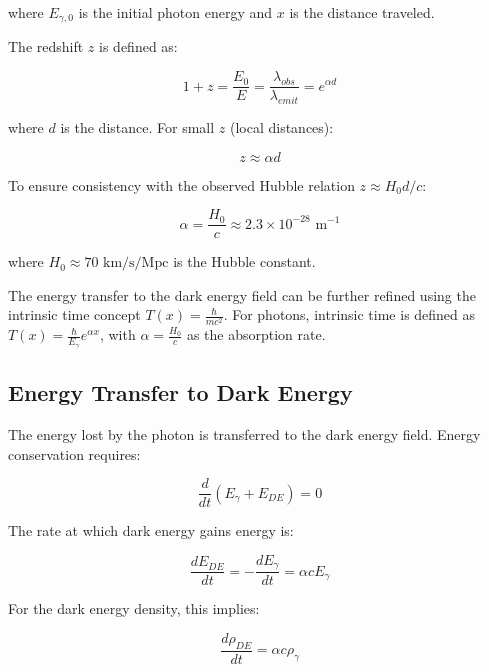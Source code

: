 \documentclass[a4paper,12pt]{article}
\theoremstyle{definition}
\theoremstyle{remark}
\newcommand{\Tfield}{T(x)}
\begin{document}
	where $E_{\gamma,0}$ is the initial photon energy and $x$ is the distance traveled.
	
	The redshift $z$ is defined as:
	
	\begin{equation}
		1 + z = \frac{E_0}{E} = \frac{\lambda_{obs}}{\lambda_{emit}} = e^{\alpha d}
	\end{equation}
	
	where $d$ is the distance. For small $z$ (local distances):
	
	\begin{equation}
		z \approx \alpha d
	\end{equation}
	
	To ensure consistency with the observed Hubble relation $z \approx H_0 d/c$:
	
	\begin{equation}
		\alpha = \frac{H_0}{c} \approx 2.3 \times 10^{-28} \text{ m}^{-1}
	\end{equation}
	
	where $H_0 \approx 70 \text{ km/s/Mpc}$ is the Hubble constant.
	
	The energy transfer to the dark energy field can be further refined using the intrinsic time concept $\Tfield = \frac{\hbar}{mc^2}$. For photons, intrinsic time is defined as $\Tfield = \frac{\hbar}{E_{\gamma}} e^{\alpha x}$, with $\alpha = \frac{H_0}{c}$ as the absorption rate.
	
	\subsection{Energy Transfer to Dark Energy}
	The energy lost by the photon is transferred to the dark energy field. Energy conservation requires:
	
	\begin{equation}
		\frac{d}{dt}(E_{\gamma} + E_{DE}) = 0
	\end{equation}
	
	The rate at which dark energy gains energy is:
	
	\begin{equation}
		\frac{dE_{DE}}{dt} = -\frac{dE_{\gamma}}{dt} = \alpha c E_{\gamma}
	\end{equation}
	
	For the dark energy density, this implies:
	
	\begin{equation}
		\frac{d\rho_{DE}}{dt} = \alpha c \rho_{\gamma}
	\end{equation}
	
\end{document}
